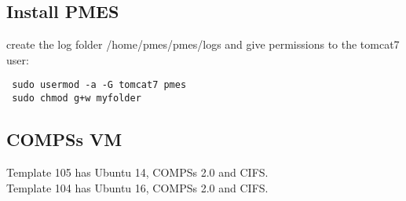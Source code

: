 \documentclass[a4paper,10pt]{article}
\begin{document}
\subsection{Install PMES}
create the log folder /home/pmes/pmes/logs and give permissions to the tomcat7 user:
\begin{verbatim}
 sudo usermod -a -G tomcat7 pmes
 sudo chmod g+w myfolder
\end{verbatim}

\subsection{COMPSs VM}
Template 105 has Ubuntu 14, COMPSs 2.0 and CIFS.\\
Template 104 has Ubuntu 16, COMPSs 2.0 and CIFS.
\end{document}
